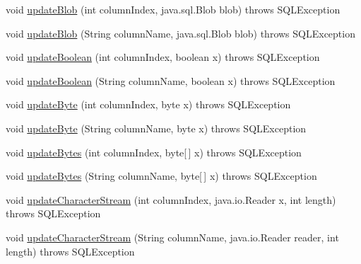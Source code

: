 \begin{DoxyCompactItemize}
\item 
void \mbox{\hyperlink{classcom_1_1mysql_1_1cj_1_1jdbc_1_1result_1_1_updatable_result_set_acc0afdc6f806da399def6402a03387aa}{update\+Blob}} (int column\+Index, java.\+sql.\+Blob blob)  throws S\+Q\+L\+Exception 
\item 
void \mbox{\hyperlink{classcom_1_1mysql_1_1cj_1_1jdbc_1_1result_1_1_updatable_result_set_a06fd4402c77652a45f2abf31514e8db2}{update\+Blob}} (String column\+Name, java.\+sql.\+Blob blob)  throws S\+Q\+L\+Exception 
\item 
void \mbox{\hyperlink{classcom_1_1mysql_1_1cj_1_1jdbc_1_1result_1_1_updatable_result_set_aab318e4e28193f43eb100eb7758e9799}{update\+Boolean}} (int column\+Index, boolean x)  throws S\+Q\+L\+Exception 
\item 
void \mbox{\hyperlink{classcom_1_1mysql_1_1cj_1_1jdbc_1_1result_1_1_updatable_result_set_aaa5f0fc037bf434c6ce5a257d0023027}{update\+Boolean}} (String column\+Name, boolean x)  throws S\+Q\+L\+Exception 
\item 
void \mbox{\hyperlink{classcom_1_1mysql_1_1cj_1_1jdbc_1_1result_1_1_updatable_result_set_af97ef94666c69719912cf33fb204a9fa}{update\+Byte}} (int column\+Index, byte x)  throws S\+Q\+L\+Exception 
\item 
void \mbox{\hyperlink{classcom_1_1mysql_1_1cj_1_1jdbc_1_1result_1_1_updatable_result_set_acc515aed62879e042cebd169c890040d}{update\+Byte}} (String column\+Name, byte x)  throws S\+Q\+L\+Exception 
\item 
void \mbox{\hyperlink{classcom_1_1mysql_1_1cj_1_1jdbc_1_1result_1_1_updatable_result_set_aba50c563e3ed3503972ca3f1f880d785}{update\+Bytes}} (int column\+Index, byte\mbox{[}$\,$\mbox{]} x)  throws S\+Q\+L\+Exception 
\item 
void \mbox{\hyperlink{classcom_1_1mysql_1_1cj_1_1jdbc_1_1result_1_1_updatable_result_set_aea4a9d0c80d3eaa266564f411f5eb6aa}{update\+Bytes}} (String column\+Name, byte\mbox{[}$\,$\mbox{]} x)  throws S\+Q\+L\+Exception 
\item 
void \mbox{\hyperlink{classcom_1_1mysql_1_1cj_1_1jdbc_1_1result_1_1_updatable_result_set_ae3dca7e7b35cac80a6a15deacde57e5b}{update\+Character\+Stream}} (int column\+Index, java.\+io.\+Reader x, int length)  throws S\+Q\+L\+Exception 
\item 
void \mbox{\hyperlink{classcom_1_1mysql_1_1cj_1_1jdbc_1_1result_1_1_updatable_result_set_a6e5325dc8df473c2155075cfd699c3a2}{update\+Character\+Stream}} (String column\+Name, java.\+io.\+Reader reader, int length)  throws S\+Q\+L\+Exception 
\item 

\end{DoxyCompactItemize}
